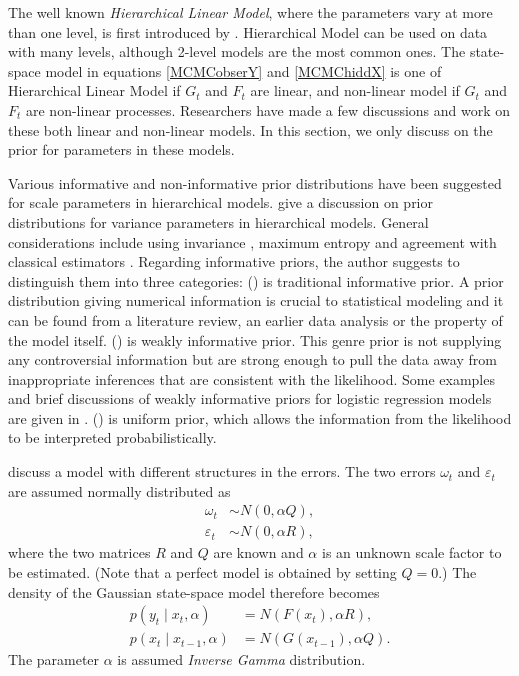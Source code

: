 The well known \textit{Hierarchical Linear Model}, where the parameters vary at more than one level, is first introduced by \cite{lindley1972bayes, smith1973general}. Hierarchical Model can be used on data with many levels, although 2-level models are the most common ones. The state-space model in equations \eqref{MCMCobserY} and \eqref{MCMChiddX} is one of Hierarchical Linear Model if $G_t$ and $F_t$ are linear, and non-linear model if $G_t$ and $F_t$ are non-linear processes. Researchers have made a few discussions and work on these both linear and non-linear models. In this section, we only discuss on the prior for parameters in these models. 

Various informative and non-informative prior distributions have been suggested for scale parameters in hierarchical models. \cite{gelman2006prior} give a discussion on prior distributions for variance parameters in hierarchical models. General considerations include using invariance \citep{jeffries1961theory}, maximum entropy \citep{jaynes1983papers} and agreement with classical estimators \citep{box2011bayesian}. Regarding informative priors, the author suggests to distinguish them into three categories: () is traditional informative prior. A prior distribution giving numerical information is crucial to statistical modeling and it can be found from a literature review, an earlier data analysis or the property of the model itself. () is weakly informative prior. This genre prior is not supplying any controversial information but are strong enough to pull the data away from inappropriate inferences that are consistent with the likelihood. Some examples and brief discussions of weakly informative priors for logistic regression models are given in \citep{gelman2008weakly}. () is uniform prior, which allows the information from the likelihood to be interpreted probabilistically. 

\cite{stroud2007sequential} discuss a model with different structures in the errors. The two errors $\omega_t$ and $\varepsilon_t$ are assumed normally distributed as
\begin{align*}
\omega_t &\sim N(0,\alpha Q),\\
\varepsilon_t &\sim N(0,\alpha R),
\end{align*}
where the two matrices $R$ and $Q$ are known and $\alpha$ is an unknown scale factor to be estimated. (Note that a perfect model is obtained by setting $Q= 0$.) The density of the Gaussian state-space model therefore becomes 
\begin{align*}
p(y_t\mid x_t,\alpha) &= N(F(x_t),\alpha R),\\
p(x_t\mid x_{t-1},\alpha) &= N(G(x_{t-1}),\alpha Q).
\end{align*}
The parameter $\alpha$ is assumed \textit{Inverse Gamma} distribution. 

